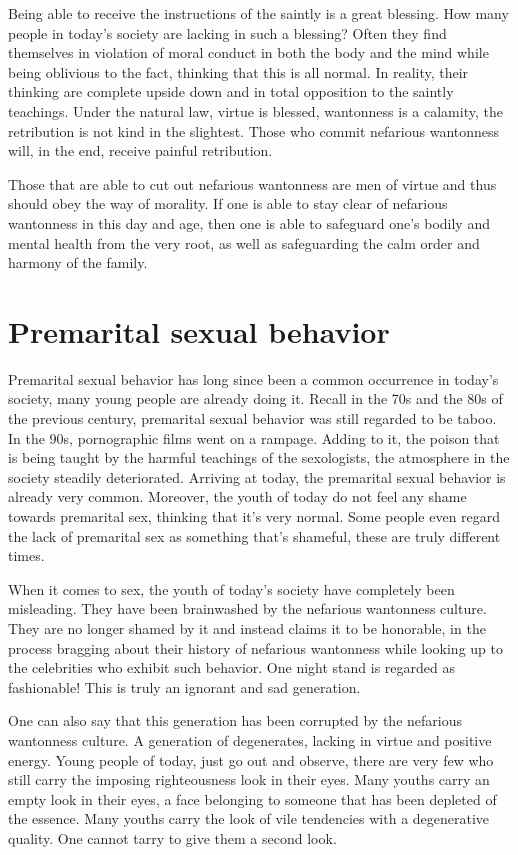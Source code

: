 \documentclass[
]{book}
\begin{document}
Being able to receive the instructions of the saintly is a great blessing. How many people in today's society are lacking in such a blessing? Often they find themselves in violation of moral conduct in both the body and the mind while being oblivious to the fact, thinking that this is all normal. In reality, their thinking are complete upside down and in total opposition to the saintly teachings. Under the natural law, virtue is blessed, wantonness is a calamity, the retribution is not kind in the slightest. Those who commit nefarious wantonness will, in the end, receive painful retribution.

Those that are able to cut out nefarious wantonness are men of virtue and thus should obey the way of morality. If one is able to stay clear of nefarious wantonness in this day and age, then one is able to safeguard one's bodily and mental health from the very root, as well as safeguarding the calm order and harmony of the family.

\hypertarget{premarital-sexual-behavior}{%
\section{Premarital sexual behavior}\label{premarital-sexual-behavior}}

Premarital sexual behavior has long since been a common occurrence in today's society, many young people are already doing it. Recall in the 70s and the 80s of the previous century, premarital sexual behavior was still regarded to be taboo. In the 90s, pornographic films went on a rampage. Adding to it, the poison that is being taught by the harmful teachings of the sexologists, the atmosphere in the society steadily deteriorated. Arriving at today, the premarital sexual behavior is already very common. Moreover, the youth of today do not feel any shame towards premarital sex, thinking that it's very normal. Some people even regard the lack of premarital sex as something that's shameful, these are truly different times.

When it comes to sex, the youth of today's society have completely been misleading. They have been brainwashed by the nefarious wantonness culture. They are no longer shamed by it and instead claims it to be honorable, in the process bragging about their history of nefarious wantonness while looking up to the celebrities who exhibit such behavior. One night stand is regarded as fashionable! This is truly an ignorant and sad generation.

One can also say that this generation has been corrupted by the nefarious wantonness culture. A generation of degenerates, lacking in virtue and positive energy. Young people of today, just go out and observe, there are very few who still carry the imposing righteousness look in their eyes. Many youths carry an empty look in their eyes, a face belonging to someone that has been depleted of the essence. Many youths carry the look of vile tendencies with a degenerative quality. One cannot tarry to give them a second look.
\end{document}

